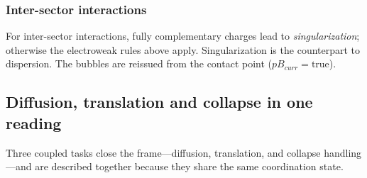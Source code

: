 \documentclass[a4paper]{article}
\begin{document}
\subsubsection{Inter-sector interactions}
For inter-sector interactions, fully complementary charges lead to \textit{singularization}; otherwise the electroweak rules above apply. Singularization is the counterpart to dispersion.
The bubbles are reissued from the contact point ($pB_{curr}=\text{true}$).
\subsection{Diffusion, translation and collapse in one reading}\label{subsec:translation}
Three coupled tasks close the frame---diffusion, translation, and collapse handling---and are described together because they share the same coordination state.
\end{document}
